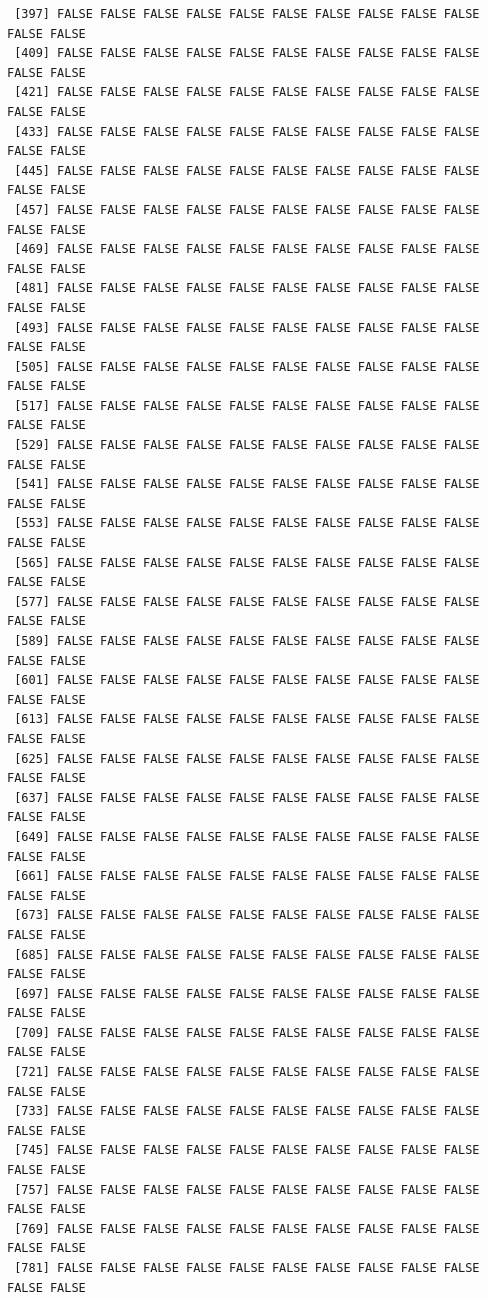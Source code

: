 \documentclass[
  letterpaper,
  DIV=11,
  numbers=noendperiod]{scrreprt}
\begin{document}
\begin{verbatim}
 [397] FALSE FALSE FALSE FALSE FALSE FALSE FALSE FALSE FALSE FALSE FALSE FALSE
 [409] FALSE FALSE FALSE FALSE FALSE FALSE FALSE FALSE FALSE FALSE FALSE FALSE
 [421] FALSE FALSE FALSE FALSE FALSE FALSE FALSE FALSE FALSE FALSE FALSE FALSE
 [433] FALSE FALSE FALSE FALSE FALSE FALSE FALSE FALSE FALSE FALSE FALSE FALSE
 [445] FALSE FALSE FALSE FALSE FALSE FALSE FALSE FALSE FALSE FALSE FALSE FALSE
 [457] FALSE FALSE FALSE FALSE FALSE FALSE FALSE FALSE FALSE FALSE FALSE FALSE
 [469] FALSE FALSE FALSE FALSE FALSE FALSE FALSE FALSE FALSE FALSE FALSE FALSE
 [481] FALSE FALSE FALSE FALSE FALSE FALSE FALSE FALSE FALSE FALSE FALSE FALSE
 [493] FALSE FALSE FALSE FALSE FALSE FALSE FALSE FALSE FALSE FALSE FALSE FALSE
 [505] FALSE FALSE FALSE FALSE FALSE FALSE FALSE FALSE FALSE FALSE FALSE FALSE
 [517] FALSE FALSE FALSE FALSE FALSE FALSE FALSE FALSE FALSE FALSE FALSE FALSE
 [529] FALSE FALSE FALSE FALSE FALSE FALSE FALSE FALSE FALSE FALSE FALSE FALSE
 [541] FALSE FALSE FALSE FALSE FALSE FALSE FALSE FALSE FALSE FALSE FALSE FALSE
 [553] FALSE FALSE FALSE FALSE FALSE FALSE FALSE FALSE FALSE FALSE FALSE FALSE
 [565] FALSE FALSE FALSE FALSE FALSE FALSE FALSE FALSE FALSE FALSE FALSE FALSE
 [577] FALSE FALSE FALSE FALSE FALSE FALSE FALSE FALSE FALSE FALSE FALSE FALSE
 [589] FALSE FALSE FALSE FALSE FALSE FALSE FALSE FALSE FALSE FALSE FALSE FALSE
 [601] FALSE FALSE FALSE FALSE FALSE FALSE FALSE FALSE FALSE FALSE FALSE FALSE
 [613] FALSE FALSE FALSE FALSE FALSE FALSE FALSE FALSE FALSE FALSE FALSE FALSE
 [625] FALSE FALSE FALSE FALSE FALSE FALSE FALSE FALSE FALSE FALSE FALSE FALSE
 [637] FALSE FALSE FALSE FALSE FALSE FALSE FALSE FALSE FALSE FALSE FALSE FALSE
 [649] FALSE FALSE FALSE FALSE FALSE FALSE FALSE FALSE FALSE FALSE FALSE FALSE
 [661] FALSE FALSE FALSE FALSE FALSE FALSE FALSE FALSE FALSE FALSE FALSE FALSE
 [673] FALSE FALSE FALSE FALSE FALSE FALSE FALSE FALSE FALSE FALSE FALSE FALSE
 [685] FALSE FALSE FALSE FALSE FALSE FALSE FALSE FALSE FALSE FALSE FALSE FALSE
 [697] FALSE FALSE FALSE FALSE FALSE FALSE FALSE FALSE FALSE FALSE FALSE FALSE
 [709] FALSE FALSE FALSE FALSE FALSE FALSE FALSE FALSE FALSE FALSE FALSE FALSE
 [721] FALSE FALSE FALSE FALSE FALSE FALSE FALSE FALSE FALSE FALSE FALSE FALSE
 [733] FALSE FALSE FALSE FALSE FALSE FALSE FALSE FALSE FALSE FALSE FALSE FALSE
 [745] FALSE FALSE FALSE FALSE FALSE FALSE FALSE FALSE FALSE FALSE FALSE FALSE
 [757] FALSE FALSE FALSE FALSE FALSE FALSE FALSE FALSE FALSE FALSE FALSE FALSE
 [769] FALSE FALSE FALSE FALSE FALSE FALSE FALSE FALSE FALSE FALSE FALSE FALSE
 [781] FALSE FALSE FALSE FALSE FALSE FALSE FALSE FALSE FALSE FALSE FALSE FALSE

\end{verbatim}
\end{document}
